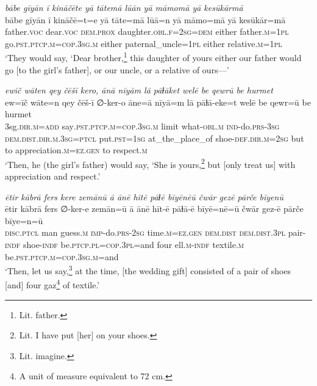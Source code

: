 \ea \label{RE.4}
\textit{bābe gīyān ī kināčēte yā tātemā lūān yā māmomā yā kesūkārmā} \\ 
\gll bābe gīyān ī kināčē=t=e yā tāte=mā lūā=n yā māmo=mā yā kesūkār=mā \\ 
 father.\textsc{voc} dear.\textsc{voc} \textsc{dem.prox} daughter\textsc{.obl}\textsc{.f}\textsc{=\textsc{2sg}}\textsc{=dem} either father\textsc{.m}\textsc{=\textsc{1pl}} go\textsc{.pst}\textsc{.ptcp}\textsc{.m}\textsc{=cop}\textsc{.3sg}\textsc{.m} either paternal\_uncle\textsc{=\textsc{1pl}} either relative\textsc{.m}\textsc{=\textsc{1pl}} \\ 
\glt `They would say, ‘Dear brother,\footnote{Lit. father.} this daughter of yours \—either our father would go [to the girl’s father], or our uncle, or a relative of ours—'
\z 
 
\ea \label{RE.10}
\textit{ewīč wāten qey čēšī kero, ānā nīyām lā pāɫāket welē be qewrū be hurmet} \\ 
\gll ew=īč wāte=n qey čēš-ī ∅-ker-o āne=ā nīyā=m lā pāɫā-eke=t welē be qewr=ū be hurmet \\ 
 3sg\textsc{.dir}\textsc{.m}\textsc{=add} say\textsc{.pst}\textsc{.ptcp}\textsc{.m}\textsc{=cop}\textsc{.3sg}\textsc{.m} limit what\textsc{-obl}\textsc{.m} \textsc{ind-}do\textsc{.prs}\textsc{-3sg} \textsc{dem.dist}\textsc{.dir}\textsc{.m}\textsc{.3sg}=\textsc{ptcl} put\textsc{.pst}\textsc{=\textsc{1sg}} at\_the\_place\_of shoe\textsc{-def}\textsc{.dir}\textsc{.m}\textsc{=\textsc{2sg}} but to appreciation\textsc{.m}\textsc{\textsc{=ez.gen}} to respect\textsc{.m} \\ 
\glt `Then, he (the girl’s father) would say, ‘She is yours,\footnote{Lit. I have put [her] on your shoes.} but [only treat us] with appreciation and respect.'
\z 
 
\ea \label{RE.11}
\textit{ētir kābrā fers kere zemānū ā ānē hītē pāɫē bīyēnēū čwār gezē pārče bīyenū} \\ 
\gll ētir kābrā fers ∅-ker-e zemān=ū ā ānē hīt-ē pāɫā-ē bīyē=nē=ū čwār gez-ē pārče bīye=n=ū \\ 
 \textsc{disc.ptcl} man guess\textsc{.m} \textsc{imp-}do\textsc{.prs}-\textsc{2sg} time\textsc{.m}\textsc{=ez.gen} \textsc{dem.dist} \textsc{dem.dist}\textsc{.3pl} pair\textsc{-indf} shoe\textsc{-indf} be\textsc{.ptcp}\textsc{.pl}\textsc{=cop}\textsc{.3pl}=and four ell\textsc{.m}\textsc{-indf} textile\textsc{.m} be\textsc{.pst}\textsc{.ptcp}\textsc{.m}\textsc{=cop}\textsc{.3sg}\textsc{.m}=and \\ 
\glt `Then, let us say,\footnote{Lit. imagine.} at the time, [the wedding gift] consisted of a pair of shoes [and] four gaz\footnote{A unit of measure equivalent to 72 cm.} of textile.'
\z 
 
